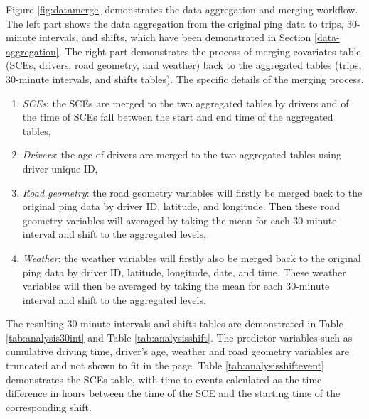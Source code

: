 \documentclass[12pt]{book}
\numberwithin{equation}{chapter}
\providecommand{\tightlist}{%
  \setlength{\itemsep}{0pt}\setlength{\parskip}{0pt}}
\begin{document}
Figure \ref{fig:datamerge} demonstrates the data aggregation and merging workflow. The left part shows the data aggregation from the original ping data to trips, 30-minute intervals, and shifts, which have been demonstrated in Section \ref{data-aggregation}. The right part demonstrates the process of merging covariates table (SCEs, drivers, road geometry, and weather) back to the aggregated tables (trips, 30-minute intervals, and shifts tables). The specific details of the merging process.

\begin{enumerate}
\def\labelenumi{\arabic{enumi}.}
\tightlist
\item
  \emph{SCEs}: the SCEs are merged to the two aggregated tables by drivers and of the time of SCEs fall between the start and end time of the aggregated tables,
\item
  \emph{Drivers}: the age of drivers are merged to the two aggregated tables using driver unique ID,
\item
  \emph{Road geometry}: the road geometry variables will firstly be merged back to the original ping data by driver ID, latitude, and longitude. Then these road geometry variables will averaged by taking the mean for each 30-minute interval and shift to the aggregated levels,
\item
  \emph{Weather}: the weather variables will firstly also be merged back to the original ping data by driver ID, latitude, longitude, date, and time. These weather variables will then be averaged by taking the mean for each 30-minute interval and shift to the aggregated levels.
\end{enumerate}

The resulting 30-minute intervals and shifts tables are demonstrated in Table \ref{tab:analysis30int} and Table \ref{tab:analysisshift}. The predictor variables such as cumulative driving time, driver's age, weather and road geometry variables are truncated and not shown to fit in the page. Table \ref{tab:analysisshiftevent} demonstrates the SCEs table, with time to events calculated as the time difference in hours between the time of the SCE and the starting time of the corresponding shift.
\end{document}
